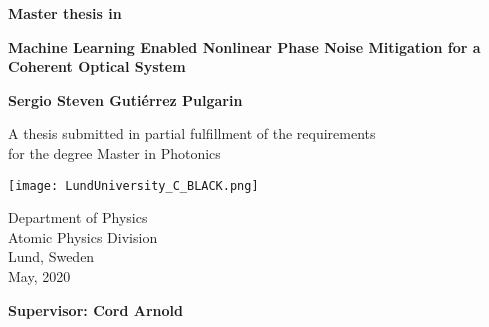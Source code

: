 
\setcounter{page}{1}

\newpage



\thispagestyle{empty}
\begin{center}
   \vspace*{1cm}
  {\large \textbf{Master thesis in  }}

  \vspace*{0.5cm}
  {\LARGE \bf\noindent \textbf{Machine Learning Enabled Nonlinear Phase Noise Mitigation for a Coherent Optical System  }}

  \vspace*{1cm}
  {\large\bf Sergio Steven Guti\'errez Pulgarin}
  
  \vfill

  {\large A thesis submitted in partial fulfillment of the requirements\\
  [1mm] for the degree Master in Photonics}
  \vspace*{0.9cm}
  
   \texttt{[image: LundUniversity\_C\_BLACK.png]}

  {\large Department of Physics \\
          [-1mm] Atomic Physics Division\\
          [-1mm] Lund, Sweden\\
          [1mm]  May, 2020}
          
  \vspace*{0.25cm}
	{\normalsize \bf \hfill Supervisor: Cord Arnold}
\end{center}

